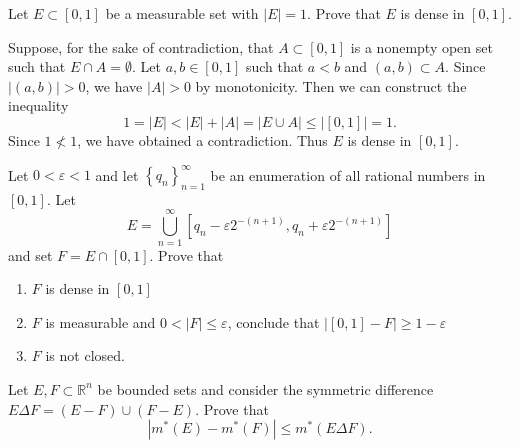 \pagebreak

\begin{problem}{2}
  Let $E \subset [0,1]$ be a measurable set with $\left| E \right| = 1$. Prove that $E$ is dense in $[0,1]$.
\end{problem}



\begin{solution}
  Suppose, for the sake of contradiction, that $A \subset [0,1]$ is a nonempty open set such that $E \cap A = \emptyset$.
  Let  $a,b \in [0,1]$ such that $a < b$ and $(a,b) \subset A$.
  Since $\left| (a,b) \right| > 0$, we have $\left| A \right|>0$ by monotonicity.
  Then we can construct the inequality 
  \[
    1 = \left| E \right| < \left| E \right| + \left| A \right| = \left| E \cup A \right| \leq \left| [0,1] \right| = 1
  .\] 
  Since $1 \not< 1$, we have obtained a contradiction.
  Thus $E$ is dense in $[0,1]$.
\end{solution}

\pagebreak

\begin{problem}{3}
  Let $0 < \varepsilon < 1$ and let $\left\{ q_{n} \right\}_{n=1}^{\infty}$ be an enumeration of all rational numbers in $[0,1]$.
  Let 
  \[
    E = \bigcup_{n=1}^{\infty}\left[q_{n} - \varepsilon 2^{-(n+1)}, q_{n} + \varepsilon 2^{-(n+1)}\right]
  \] 
  and set $F = E \cap [0,1]$. Prove that
  \begin{enumerate}
    \item $F$ is dense in $[0,1]$
    \item $F$ is measurable and $0 < \left| F \right| \leq \varepsilon$, conclude that $\left| [0,1] - F \right| \geq 1 - \varepsilon$ 
    \item $F$ is not closed.
  \end{enumerate}

\end{problem}


\begin{solution}
\end{solution}

\pagebreak

\begin{problem}{4}
  Let $E,F \subset \mathbb{R}^{n}$ be bounded sets and consider the symmetric difference $E \Delta F = \left( E - F \right) \cup \left( F - E \right) $.
  Prove that
  \[
    \left| m^{*}(E) - m^{*}(F) \right| \leq m^{*}(E \Delta F)
  .\] 
\end{problem}


